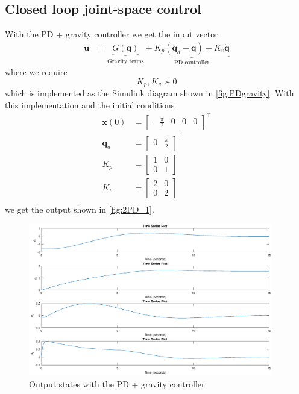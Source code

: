\documentclass[a4paper]{scrartcl}
\begin{document}
\subsection{Closed loop joint-space control}
With the PD + gravity controller we get the input vector
\begin{equation}
	\begin{aligned}
		\bm{u} &= \underbrace{G(\bm{q})}_{\text{Gravity terms}} + \underbrace{K_p(\bm{q}_d - \bm{q}) - K_v \dot{\bm{q}}}_{\text{PD-controller}}
	\end{aligned}
\end{equation}
where we require
\begin{equation}
	K_p, K_v \succ 0
\end{equation}
which is implemented as the Simulink diagram shown in \autoref{fig:PDgravity}. With this implementation and the initial conditions 
\begin{equation}
	\begin{aligned}
		\bm{x}(0) &= \begin{bmatrix} -\tfrac{\pi}{2} & 0 & 0 & 0 \end{bmatrix}^\top \\
		\bm{q}_d &= \begin{bmatrix} 0 & \tfrac{\pi}{2} \end{bmatrix}^\top \\
		K_p &= \begin{bmatrix} 1 & 0 \\ 0 & 1 \end{bmatrix}\\
		K_v &= \begin{bmatrix} 2 & 0 \\ 0 & 2 \end{bmatrix}\\
	\end{aligned}
\end{equation}
we get the output shown in \autoref{fig:2PD_1}.

\begin{figure}[ht]
	\centering
	\includegraphics[width=0.95\textwidth]{fig/2PDg_1.eps}
	\caption{Output states with the PD + gravity controller}
	\label{fig:2PD_1}
\end{figure}
\end{document}
